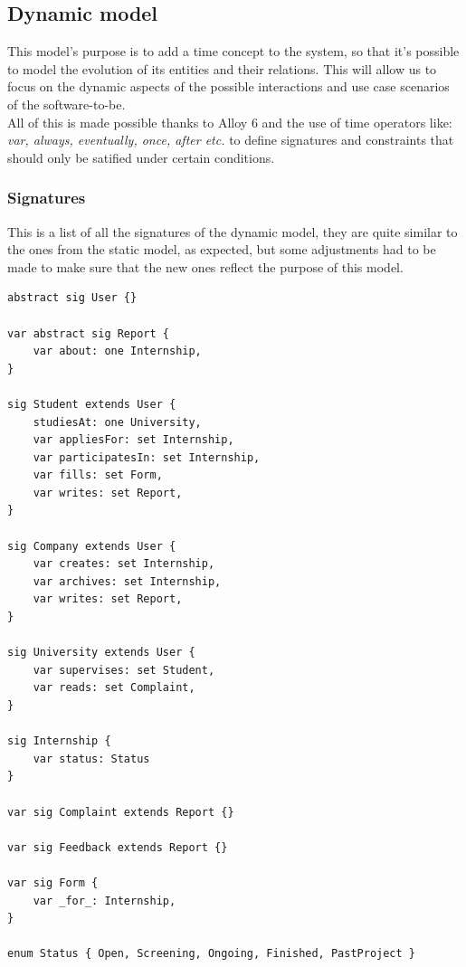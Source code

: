 \documentclass[11pt,twoside]{article}
\begin{document}
	\subsection{Dynamic model}
This model's purpose is to add a time concept to the system, so that it's possible to model the evolution of its entities and their relations. This will allow us to focus on the dynamic aspects of the possible interactions and use case scenarios of the software-to-be. \\
All of this is made possible thanks to Alloy 6 and the use of time operators like: \textit{var, always, eventually, once, after etc.} to define signatures and constraints that should only be satified under certain conditions. \\
	\subsubsection{Signatures}
This is a list of all the signatures of the dynamic model, they are quite similar to the ones from the static model, as expected, but some adjustments had to be made to make sure that the new ones reflect the purpose of this model.

{\small
\begin{verbatim}
abstract sig User {}

var abstract sig Report {
    var about: one Internship,
}

sig Student extends User {
	studiesAt: one University,
    var appliesFor: set Internship,
    var participatesIn: set Internship,
    var fills: set Form,
    var writes: set Report,
}

sig Company extends User {
    var creates: set Internship,
    var archives: set Internship,
    var writes: set Report,
}

sig University extends User {
    var supervises: set Student,
    var reads: set Complaint,
}

sig Internship {
    var status: Status
}

var sig Complaint extends Report {}

var sig Feedback extends Report {}

var sig Form {
    var _for_: Internship,
}

enum Status { Open, Screening, Ongoing, Finished, PastProject }

\end{verbatim}
}
\end{document}

